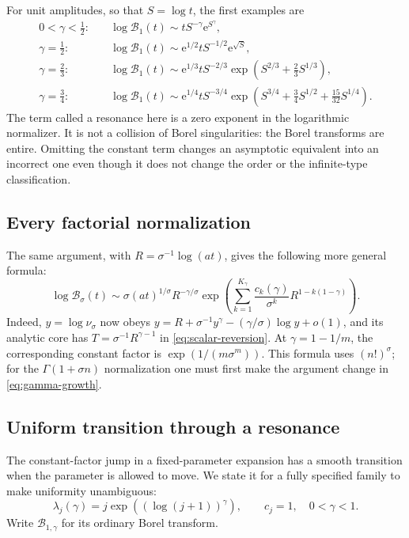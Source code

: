 \documentclass[11pt,a4paper]{article}
\numberwithin{equation}{section}
\theoremstyle{definition}
\theoremstyle{remark}
\newcommand{\Bcal}{\mathcal B}
\newcommand{\ee}{\mathrm e}
\begin{document}
For unit amplitudes, so that $S=\log t$, the first examples are
\begin{align}
 0<\gamma<\tfrac12:\quad
 &\log\Bcal_1(t)\sim tS^{-\gamma}\ee^{S^\gamma},
 \label{eq:first-region}\\
 \gamma=\tfrac12:\quad
 &\log\Bcal_1(t)\sim\ee^{1/2}tS^{-1/2}\ee^{\sqrt S},
 \label{eq:half}\\
 \gamma=\tfrac23:\quad
 &\log\Bcal_1(t)\sim\ee^{1/3}tS^{-2/3}
       \exp\left(S^{2/3}+\tfrac23S^{1/3}\right),
 \label{eq:two-thirds}\\
 \gamma=\tfrac34:\quad
 &\log\Bcal_1(t)\sim\ee^{1/4}tS^{-3/4}
       \exp\left(S^{3/4}+\tfrac34S^{1/2}+\tfrac{15}{32}S^{1/4}\right).
 \label{eq:three-quarters}
\end{align}
The term called a resonance here is a zero exponent in the logarithmic
normalizer. It is not a collision of Borel singularities: the Borel
transforms are entire. Omitting the constant term changes an asymptotic
equivalent into an incorrect one even though it does not change the
order or the infinite-type classification.

\subsection{Every factorial normalization}
The same argument, with
$R=\sigma^{-1}\log(at)$, gives the following more general formula:
\begin{equation}
 \log\Bcal_\sigma(t)\sim
 \sigma(at)^{1/\sigma}R^{-\gamma/\sigma}
 \exp\left(\sum_{k=1}^{K_\gamma}
 \frac{c_k(\gamma)}{\sigma^k}R^{1-k(1-\gamma)}\right).
 \label{eq:sigma-cascade}
\end{equation}
Indeed, $y=\log\nu_\sigma$ now obeys
$y=R+\sigma^{-1}y^\gamma-(\gamma/\sigma)\log y+o(1)$, and its
analytic core has $T=\sigma^{-1}R^{\gamma-1}$ in
\eqref{eq:scalar-reversion}. At $\gamma=1-1/m$, the corresponding
constant factor is $\exp(1/(m\sigma^m))$. This formula uses
$(n!)^\sigma$; for the $\Gamma(1+\sigma n)$ normalization one must
first make the argument change in \eqref{eq:gamma-growth}.

\subsection{Uniform transition through a resonance}
The constant-factor jump in a fixed-parameter expansion has a smooth
transition when the parameter is allowed to move. We state it for a
fully specified family to make uniformity unambiguous:
\begin{equation}
 \lambda_j(\gamma)=j\exp((\log(j+1))^\gamma),\qquad c_j=1,
 \quad 0<\gamma<1.
 \label{eq:uniform-family}
\end{equation}
Write $\Bcal_{1,\gamma}$ for its ordinary Borel transform.
\end{document}
